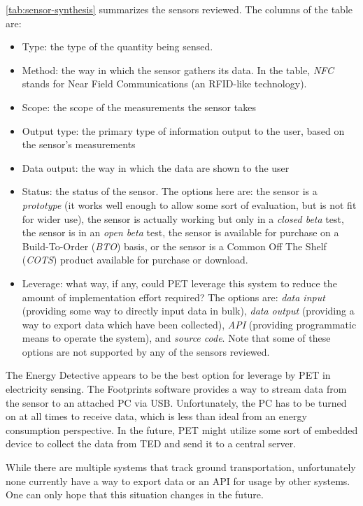 \autoref{tab:sensor-synthesis} summarizes the sensors reviewed. The columns of the table are:

\begin{itemize}
	\item Type: the type of the quantity being sensed.
	\item Method: the way in which the sensor gathers its data. In the table, \emph{NFC} stands for Near Field Communications (an RFID-like technology).
	\item Scope: the scope of the measurements the sensor takes
	\item Output type: the primary type of information output to the user, based on the sensor's measurements
	\item Data output: the way in which the data are shown to the user
	\item Status: the status of the sensor. The options here are: the sensor is a \emph{prototype} (it works well enough to allow some sort of evaluation, but is not fit for wider use), the sensor is actually working but only in a \emph{closed beta} test, the sensor is in an \emph{open beta} test, the sensor is available for purchase on a Build-To-Order (\emph{BTO}) basis, or the sensor is a Common Off The Shelf (\emph{COTS}) product available for purchase or download.
	\item Leverage: what way, if any, could PET leverage this system to reduce the amount of implementation effort required? The options are: \emph{data input} (providing some way to directly input data in bulk), \emph{data output} (providing a way to export data which have been collected), \emph{API} (providing programmatic means to operate the system), and \emph{source code}. Note that some of these options are not supported by any of the sensors reviewed.
\end{itemize}

The Energy Detective appears to be the best option for leverage by PET in electricity sensing. The Footprints software provides a way to stream data from the sensor to an attached PC via USB. Unfortunately, the PC has to be turned on at all times to receive data, which is less than ideal from an energy consumption perspective. In the future, PET might utilize some sort of embedded device to collect the data from TED and send it to a central server.

While there are multiple systems that track ground transportation, unfortunately none currently have a way to export data or an API for usage by other systems. One can only hope that this situation changes in the future.


